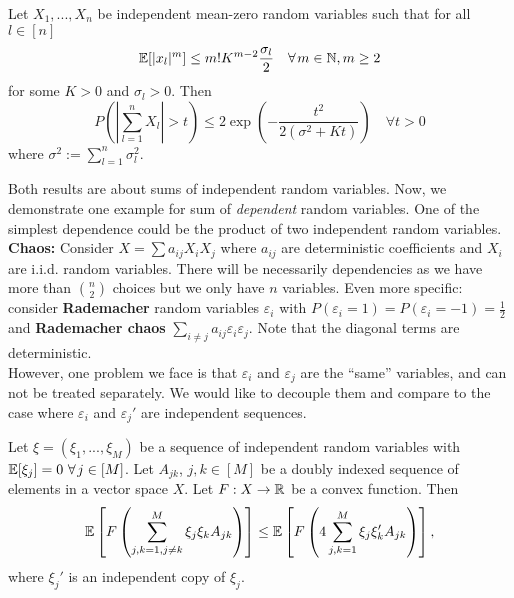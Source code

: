 \begin{prop}
\begin{mdframed}
Let $X_1,...,X_n$ be independent mean-zero random variables such that for all $l\in [n]$\vspace{-0.3pc}
\begin{equation*}
\E[|x_l|^m] \leq m! K^{m-2} \frac{\sigma_l}{2}	\quad \forall m\in\N,m\geq 2\vspace{-0.3pc}
\end{equation*}
for some $K>0$ and $\sigma_l>0$. Then
\begin{equation*}
P\left(\left|
\sum_{l=1}^n X_l
\right| > t \right) \leq 2 \exp \left( 
- \frac{t^2}{2(\sigma^2+Kt)}
\right)	\quad \forall t>0
\end{equation*}
where $\sigma^2 := \sum_{l=1}^n \sigma_l^2$.
\end{mdframed}
\end{prop}
Both results are about sums of independent random variables. Now, we demonstrate one example for sum of \emph{dependent} random variables. One of the simplest dependence could be the product of two independent random variables. \vspace{0.5pc}\\
\textbf{Chaos:} Consider $X= \sum a_{ij} X_iX_j$ where $a_{ij}$ are deterministic coefficients and $X_i$ are i.i.d. random variables. There will be necessarily dependencies as we have more than $\binom{n}{2}$ choices but we only have $n$ variables. Even more specific: consider \textbf{Rademacher} random variables $\varepsilon_i$ with $P(\varepsilon_i =1) = P(\varepsilon_i = -1) = \frac{1}{2}$ and \textbf{Rademacher chaos}
$\sum_{i\neq j} a_{ij}\varepsilon_i \varepsilon_j.$
Note that the diagonal terms are deterministic. \vspace{0.5pc}\\
However, one problem we face is that $\varepsilon_i$ and $\varepsilon_j$ are the ``same'' variables, and can not be treated separately. We would like to decouple them and compare to the case where $\varepsilon_i$ and $\varepsilon_j'$ are independent sequences. 
\begin{lemma}[Decoupling] \label{lemma:decoupling}
\begin{mdframed}
Let $\xi = (\xi_1,...,\xi_M)$ be a sequence of independent random variables with $\E [\xi_j] =0 \ \forall j\in [M]$. Let $A_{jk}$, $j,k\in [M]$ be a doubly indexed sequence of elements in a vector space $X$. Let $F:X\to \mathbb{R}$ be a convex function. Then
\begin{equation*}
\mathbb{E}\left[ F \left(
\sum_{j,k=1,j\neq k}^M \xi_j \xi_k A_{jk} \right)
\right] \leq \mathbb{E} \left[
F \left(
4 \sum_{j,k=1}^M \xi_j \xi_k' A_{jk}
\right)\right],
\end{equation*}
where $\xi_j'$ is an independent copy of $\xi_j$.
\end{mdframed}
\end{lemma}
